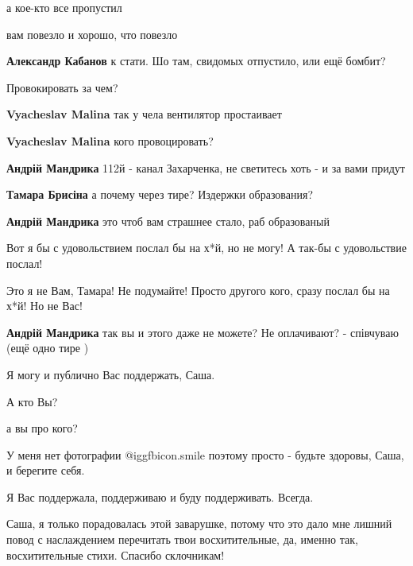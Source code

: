 \begin{itemize}

а кое-кто все пропустил

вам повезло и хорошо, что повезло

\textbf{Александр Кабанов} к стати. Шо там, свидомых отпустило, или ещё бомбит?

\begin{itemize} %
Провокировать за чем?


\textbf{Vyacheslav Malina} так у чела вентилятор простаивает

\textbf{Vyacheslav Malina} кого провоцировать?

\textbf{Андрій Мандрика} 112й - канал Захарченка, не светитесь хоть - и за вами придут

\textbf{Тамара Брисіна} а почему через тире? Издержки образования?

\textbf{Андрій Мандрика} это чтоб вам страшнее стало, раб образованый

Вот я бы с удовольствием послал бы на х*й, но не могу! А так-бы с удовольствие послал!

Это я не Вам, Тамара! Не подумайте! Просто другого кого, сразу послал бы на х*й! Но не Вас!

\textbf{Андрій Мандрика} так вы и этого даже не можете? Не оплачивают? - співчуваю (ещё одно тире )
\end{itemize} %


Я могу и публично Вас поддержать, Саша.

А кто Вы?


а вы про кого?

У меня нет фотографии  @igg{fbicon.smile}  поэтому просто - будьте здоровы, Саша, и берегите себя.

Я Вас поддержала, поддерживаю и буду поддерживать. Всегда.


Саша, я только порадовалась этой заварушке, потому что это дало мне лишний
повод с наслаждением перечитать твои восхитительные, да, именно так,
восхитительные стихи. Спасибо склочникам!



\end{itemize}
